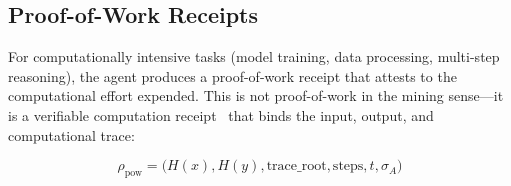 \subsection{Proof-of-Work Receipts}

For computationally intensive tasks (model training, data processing, multi-step reasoning), the agent produces a proof-of-work receipt that attests to the computational effort expended. This is not proof-of-work in the mining sense---it is a verifiable computation receipt~\cite{gennaro2010verifiable} that binds the input, output, and computational trace:

\begin{equation}\label{eq:pow-receipt}
    \rho_{\text{pow}} = \big(H(x), H(y), \text{trace\_root}, \text{steps}, t, \sigma_A\big)
\end{equation}

